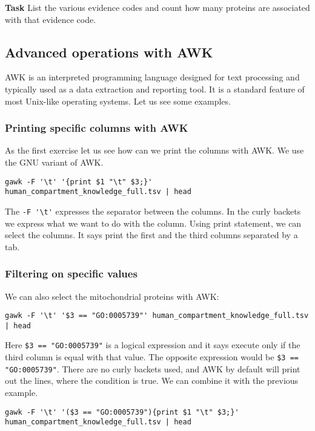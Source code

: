 \documentclass{article}\usepackage[]{graphicx}\usepackage[usenames,dvipsnames]{color}
\begin{document}
\textbf{Task} List the various evidence codes and count how many proteins are associated with that evidence code.

\subsection{Advanced operations with AWK}

AWK is an interpreted programming language designed for text processing and typically used as a data extraction and reporting tool. It is a standard feature of most Unix-like operating systems. Let us see some examples.

\subsubsection*{Printing specific columns with AWK}

As the first exercise let us see how can we print the columns with AWK. We use the GNU variant of AWK.

\begin{verbatim}
gawk -F '\t' '{print $1 "\t" $3;}' human_compartment_knowledge_full.tsv | head
\end{verbatim}

The \verb+-F '\t'+ expresses the separator between the columns. In the curly backets we express what we want to do with the column. Using print statement, we can select the columns. It says print the first and the third columns separated by a tab.

\subsubsection*{Filtering on specific values}

We can also select the mitochondrial proteins with AWK:

\begin{verbatim}
gawk -F '\t' '$3 == "GO:0005739"' human_compartment_knowledge_full.tsv | head
\end{verbatim}

Here \verb+$3 == "GO:0005739"+ is a logical expression and it says execute only if the third column is equal with that value. The opposite expression would be \verb+$3 == "GO:0005739"+. There are no curly backets used, and AWK by default will print out the lines, where the condition is true. We can combine it with the previous example.

\begin{verbatim}
gawk -F '\t' '($3 == "GO:0005739"){print $1 "\t" $3;}' human_compartment_knowledge_full.tsv | head
\end{verbatim}
\end{document}
